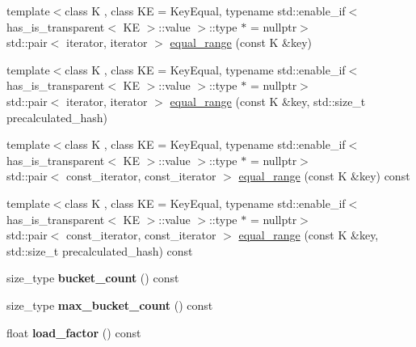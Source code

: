 \begin{DoxyCompactItemize}
\item 
{\footnotesize template$<$class K , class KE  = Key\+Equal, typename std\+::enable\+\_\+if$<$ has\+\_\+is\+\_\+transparent$<$ K\+E $>$\+::value $>$\+::type $\ast$  = nullptr$>$ }\\std\+::pair$<$ iterator, iterator $>$ \mbox{\hyperlink{classtsl_1_1ordered__set_a5a2a9aca80e60c35f6a876f87015c335}{equal\+\_\+range}} (const K \&key)
\item 
{\footnotesize template$<$class K , class KE  = Key\+Equal, typename std\+::enable\+\_\+if$<$ has\+\_\+is\+\_\+transparent$<$ K\+E $>$\+::value $>$\+::type $\ast$  = nullptr$>$ }\\std\+::pair$<$ iterator, iterator $>$ \mbox{\hyperlink{classtsl_1_1ordered__set_a80cd49bbc9a568fe78c14e7d80b81c9c}{equal\+\_\+range}} (const K \&key, std\+::size\+\_\+t precalculated\+\_\+hash)
\item 
{\footnotesize template$<$class K , class KE  = Key\+Equal, typename std\+::enable\+\_\+if$<$ has\+\_\+is\+\_\+transparent$<$ K\+E $>$\+::value $>$\+::type $\ast$  = nullptr$>$ }\\std\+::pair$<$ const\+\_\+iterator, const\+\_\+iterator $>$ \mbox{\hyperlink{classtsl_1_1ordered__set_ada7f0385f77d78519f0eb6270cb70d62}{equal\+\_\+range}} (const K \&key) const
\item 
{\footnotesize template$<$class K , class KE  = Key\+Equal, typename std\+::enable\+\_\+if$<$ has\+\_\+is\+\_\+transparent$<$ K\+E $>$\+::value $>$\+::type $\ast$  = nullptr$>$ }\\std\+::pair$<$ const\+\_\+iterator, const\+\_\+iterator $>$ \mbox{\hyperlink{classtsl_1_1ordered__set_aa6f8c028631f989a0ba04df9a6e66a04}{equal\+\_\+range}} (const K \&key, std\+::size\+\_\+t precalculated\+\_\+hash) const
\item 
\mbox{\label{classtsl_1_1ordered__set_ad9889c1abde8a4980dcedca11a4da90a}} 
size\+\_\+type {\bfseries bucket\+\_\+count} () const
\item 
\mbox{\label{classtsl_1_1ordered__set_adbaddfe46e1e201edceb2f46d17cfafe}} 
size\+\_\+type {\bfseries max\+\_\+bucket\+\_\+count} () const
\item 
\mbox{\label{classtsl_1_1ordered__set_a7da7f251fd80a9091d334adcb5aeaede}} 
float {\bfseries load\+\_\+factor} () const
\item 

\end{DoxyCompactItemize}
